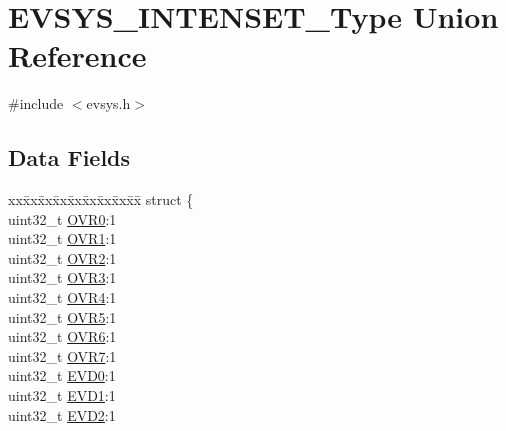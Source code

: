 \hypertarget{union_e_v_s_y_s___i_n_t_e_n_s_e_t___type}{}\section{E\+V\+S\+Y\+S\+\_\+\+I\+N\+T\+E\+N\+S\+E\+T\+\_\+\+Type Union Reference}
\label{union_e_v_s_y_s___i_n_t_e_n_s_e_t___type}


{\ttfamily \#include $<$evsys.\+h$>$}

\subsection*{Data Fields}
\begin{DoxyCompactItemize}
\item 
\begin{tabbing}
xx\=xx\=xx\=xx\=xx\=xx\=xx\=xx\=xx\=\kill
struct \{\\
\>uint32\_t \mbox{\hyperlink{union_e_v_s_y_s___i_n_t_e_n_s_e_t___type_a68765deb259eed50fabcdf3d67161d9c}{OVR0}}:1\\
\>uint32\_t \mbox{\hyperlink{union_e_v_s_y_s___i_n_t_e_n_s_e_t___type_ab4500fbc729eb68af1169834db644496}{OVR1}}:1\\
\>uint32\_t \mbox{\hyperlink{union_e_v_s_y_s___i_n_t_e_n_s_e_t___type_a19ff2de00d937f7828dbac942854e02b}{OVR2}}:1\\
\>uint32\_t \mbox{\hyperlink{union_e_v_s_y_s___i_n_t_e_n_s_e_t___type_a7547a1999ed5ace810cbc6e6de3cfc31}{OVR3}}:1\\
\>uint32\_t \mbox{\hyperlink{union_e_v_s_y_s___i_n_t_e_n_s_e_t___type_a9505772fbd48ac14d080d014e378f12c}{OVR4}}:1\\
\>uint32\_t \mbox{\hyperlink{union_e_v_s_y_s___i_n_t_e_n_s_e_t___type_a53d9ffb7d90de59a4243113fdc1af972}{OVR5}}:1\\
\>uint32\_t \mbox{\hyperlink{union_e_v_s_y_s___i_n_t_e_n_s_e_t___type_a88825bfc918383b1cd4478c6018dc1b1}{OVR6}}:1\\
\>uint32\_t \mbox{\hyperlink{union_e_v_s_y_s___i_n_t_e_n_s_e_t___type_ac5c0adbfa6907f46b42a8509a20eb00d}{OVR7}}:1\\
\>uint32\_t \mbox{\hyperlink{union_e_v_s_y_s___i_n_t_e_n_s_e_t___type_a0e344ebebb2c4bdbb78b3ad34ca5b30f}{EVD0}}:1\\
\>uint32\_t \mbox{\hyperlink{union_e_v_s_y_s___i_n_t_e_n_s_e_t___type_ae20170496579de36130485d6500b5b73}{EVD1}}:1\\
\>uint32\_t \mbox{\hyperlink{union_e_v_s_y_s___i_n_t_e_n_s_e_t___type_a2a1e9817b34931b63082efaa98baa640}{EVD2}}:1\\

\end{tabbing}
\end{DoxyCompactItemize}
